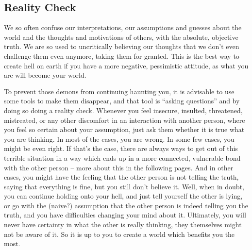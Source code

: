 \subsection{Reality Check}\label{subsec:reality-check}

We so often confuse our interpretations, our assumptions and guesses about the world and the thoughts and motivations of others, with the absolute, objective truth.
We are so used to uncritically believing our thoughts that we don't even challenge them even anymore, taking them for granted.
This is the best way to create hell on earth if you have a more negative, pessimistic attitude, as what you are will become your world.

To prevent those demons from continuing haunting you, it is advisable to use some tools to make them disappear, and that tool is ``asking questions'' and by doing so doing a reality check.
Whenever you feel insecure, insulted, threatened, mistreated, or any other discomfort in an interaction with another person, where you feel so certain about your assumption, just ask them whether it is true what you are thinking.
In most of the cases, you are wrong.
In some few cases, you might be even right.
If that's the case, there are always ways to get out of this terrible situation in a way which ends up in a more connected, vulnerable bond with the other person -- more about this in the following pages.
And in other cases, you might have the feeling that the other person is not telling the truth, saying that everything is fine, but you still don't believe it.
Well, when in doubt, you can continue holding onto your hell, and just tell yourself the other is lying, or go with the (naive?) assumption that the other person is indeed telling you the truth, and you have difficulties changing your mind about it.
Ultimately, you will never have certainty in what the other is really thinking, they themselves might not be aware of it.
So it is up to you to create a world which benefits you the most.

